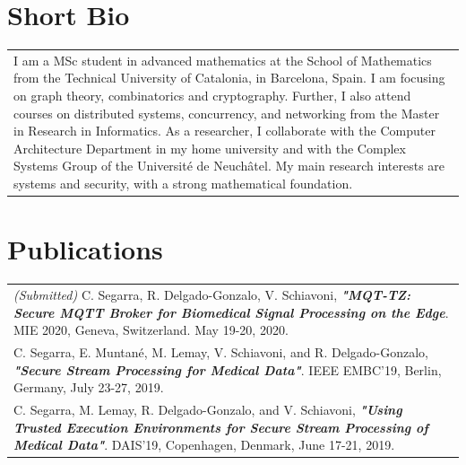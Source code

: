 \documentclass[a4paper,10pt]{article} %
\begin{document}
\section{Short Bio}
\begin{tabular}{p{}}
    I am a MSc student in advanced mathematics at the School of Mathematics from the Technical University of Catalonia, in Barcelona, Spain.
    I am focusing on graph theory, combinatorics and cryptography.
    Further, I also attend courses on distributed systems, concurrency, and networking from the Master in Research in Informatics.
    As a researcher, I collaborate with the Computer Architecture Department in my home university and with the Complex Systems Group of the Universit\'e de Neuch\^atel. 
    My main research interests are systems and security, with a strong mathematical foundation.
\end{tabular}

\section{Publications}
\begin{tabular}{p{}}
    \textit{(Submitted)} C. Segarra, R. Delgado-Gonzalo, V. Schiavoni, \textbf{\textit{"MQT-TZ: Secure MQTT Broker for Biomedical Signal Processing on the Edge}}. MIE 2020, Geneva, Switzerland. May 19-20, 2020. \\[3pt]
    C. Segarra, E. Muntan\'e, M. Lemay, V. Schiavoni, and  R. Delgado-Gonzalo, \textbf{\textit{"Secure Stream Processing for Medical Data"}}. IEEE EMBC'19, Berlin, Germany, July 23-27, 2019. \\[3pt]
    C. Segarra, M. Lemay, R. Delgado-Gonzalo, and V. Schiavoni, \textbf{\textit{"Using Trusted Execution Environments for Secure Stream Processing of Medical Data"}}. DAIS'19, Copenhagen, Denmark, June 17-21, 2019. \\
\end{tabular}
\end{document}
